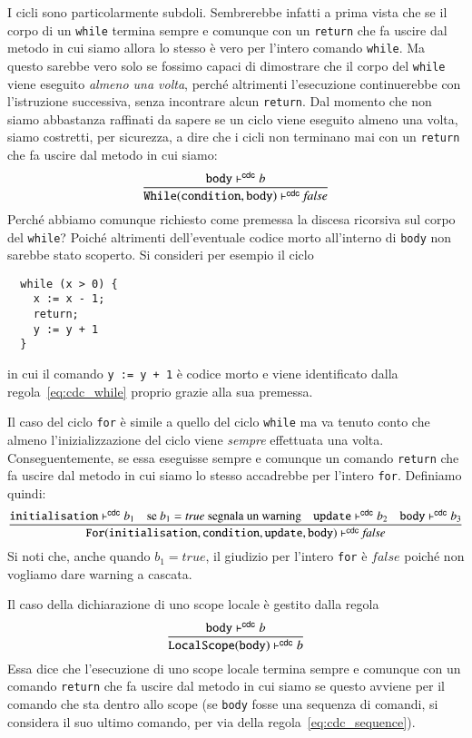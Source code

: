 I cicli sono particolarmente subdoli. Sembrerebbe infatti a prima vista che se
il corpo di un \texttt{while} termina sempre e comunque con un \texttt{return}
che fa uscire dal metodo in cui siamo
allora lo stesso \`e vero per l'intero comando \texttt{while}.
Ma questo sarebbe vero solo se fossimo capaci di dimostrare
che il corpo del \texttt{while} viene eseguito \emph{almeno una volta},
perch\'e altrimenti l'esecuzione continuerebbe
con l'istruzione successiva, senza
incontrare alcun \texttt{return}. Dal momento che non siamo abbastanza
raffinati da sapere se un ciclo viene eseguito almeno una volta, siamo
costretti, per sicurezza, a dire che i cicli non terminano mai con un
\texttt{return} che fa uscire dal metodo in cui siamo:
%
\begin{equation}\label{eq:cdc_while}
  \frac{\mathtt{body}\vdash^{\mathsf{cdc}} b}
    {\mathtt{While(condition,body)}\vdash^{\mathsf{cdc}}\mathit{false}}
\end{equation}
%
Perch\'e abbiamo comunque richiesto come premessa la discesa ricorsiva sul
corpo del \texttt{while}? Poich\'e altrimenti dell'eventuale codice morto
all'interno di \texttt{body} non sarebbe stato scoperto. Si consideri per
esempio il ciclo
%
\begin{verbatim}
  while (x > 0) {
    x := x - 1;
    return;
    y := y + 1
  }
\end{verbatim}
%
in cui il comando \texttt{y := y + 1} \`e codice morto e viene identificato
dalla regola~\eqref{eq:cdc_while} proprio grazie alla sua premessa.

Il caso del ciclo \texttt{for} \`e simile a quello del ciclo \texttt{while}
ma va tenuto conto che almeno l'inizializzazione del ciclo viene \emph{sempre}
effettuata una volta. Conseguentemente, se essa eseguisse sempre e comunque
un comando \texttt{return} che fa uscire dal metodo in cui siamo lo stesso
accadrebbe per l'intero \texttt{for}. Definiamo quindi:
%
\begin{equation}\label{eq:cdc_for}
  \frac{\mathtt{initialisation}\vdash^{\mathsf{cdc}} b_1\quad
        \text{se }b_1=\mathit{true}\text{ segnala un warning}
        \quad\mathtt{update}\vdash^{\mathsf{cdc}} b_2\quad\mathtt{body}\vdash^{\mathsf{cdc}} b_3}
    {\mathtt{For(initialisation,condition,update,body)}\vdash^{\mathsf{cdc}}\mathit{false}}
\end{equation}
%
Si noti che, anche quando $b_1=\mathit{true}$, il giudizio per l'intero
\texttt{for} \`e $\mathit{false}$ poich\'e non vogliamo dare warning
a cascata.

Il caso della dichiarazione di uno scope locale \`e gestito dalla regola
%
\[
  \frac{\mathtt{body}\vdash^{\mathsf{cdc}} b}{\mathtt{LocalScope(body)}\vdash^{\mathsf{cdc}} b}
\]
%
Essa dice che l'esecuzione di uno scope locale termina sempre e comunque
con un comando \texttt{return} che fa uscire dal metodo in cui siamo
se questo avviene per il comando che sta
dentro allo scope (se \texttt{body} fosse una sequenza di comandi, si considera
il suo ultimo comando, per via della regola~\eqref{eq:cdc_sequence}).


